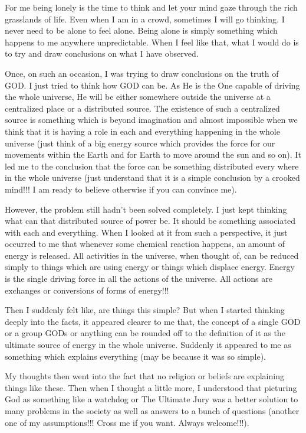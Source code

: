 \vskip 2pt

For me being lonely is the time to think and let your mind gaze through the rich grasslands of life. Even when I am in a crowd, sometimes I will go thinking. I never need to be alone to feel alone. Being alone is simply something which happens to me anywhere unpredictable. When I feel like that, what I would do is to try and draw conclusions on what I have observed.

Once, on such an occasion, I was trying to draw conclusions on the truth of GOD. I just tried to think how GOD can be. As He is the One capable of driving the whole universe, He will be either somewhere outside the universe at a centralized place or a distributed source. The existence of such a centralized source is something which is beyond imagination and almost impossible when we think that it is having a role in each and everything happening in the whole universe (just think of a big energy source which provides the force for our movements within the Earth and for Earth to move around the sun and so on). It led me to the conclusion that the force can be something distributed every where in the whole universe (just understand that it is a simple conclusion by a crooked mind!!! I am ready to believe otherwise if you can convince me).

However, the problem still hadn't been solved completely. I just kept thinking what can that distributed source of power be. It should be something associated with each and everything. When I looked at it from such a perspective, it just occurred to me that whenever some chemical reaction happens, an amount of energy is released. All activities in the universe, when thought of, can be reduced simply to things which are using energy or things which displace energy. Energy is the single driving force in all the actions of the universe. All actions are exchanges or conversions of forms of energy!!!

Then I suddenly felt like, are things this simple? But when I started thinking deeply into the facts, it appeared clearer to me that, the concept of a single GOD or a group GODs or anything can be rounded off to the definition of it as the ultimate source of energy in the whole universe. Suddenly it appeared to me as something which explains everything (may be because it was so simple).

My thoughts then went into the fact that no religion or beliefs are explaining things like these. Then when I thought a little more, I understood that picturing God as something like a watchdog or The Ultimate Jury was a better solution to many problems in the society as well as answers to a bunch of questions (another one of my assumptions!!! Cross me if you want. Always welcome!!!).


